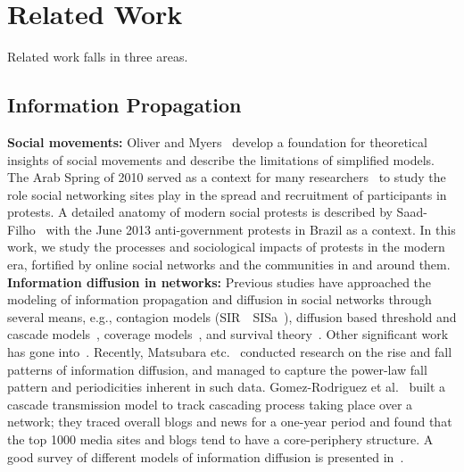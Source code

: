 \chapter{Related Work}
\label{ch:related}

Related work falls in three areas.

\section{Information Propagation}
\par \noindent
{\bf Social movements:}
Oliver and Myers~\cite{oliver1998diffusion} develop a foundation for theoretical insights of social movements and describe the limitations of simplified models. The Arab Spring of  2010
served as a context for many researchers~\cite{gonzalez2011dynamics, bond201261, tufekci2012social, conover2013digital, saad2013mass} to study the role social networking sites play in the spread and recruitment of participants in protests. A detailed anatomy of modern social protests is described by Saad-Filho~\cite{saad2013mass} with the June 2013 anti-government protests in Brazil as a context.
In this work, we study the processes and sociological impacts of protests in the modern era, fortified by online social networks and the communities in and around them.\\


\noindent
{\bf Information diffusion in networks:}
Previous studies have approached the modeling of information propagation and diffusion in social networks through several means, e.g., contagion models (SIR~\cite{castellini2007propagation}\, SISa~\cite{hill2010emotions}), diffusion based threshold and cascade models~\cite{kempe2003maximizing}, coverage models~\cite{singer2012win}, and survival theory~\cite{rodriguez2013modeling}. Other significant work has gone into~\cite{Cha10measuringuser,Kwak:2010:TSN:1772690.1772751,Romero:2011:DMI:1963405.1963503,Yang_predictingthe}.
Recently, Matsubara etc.~\cite{matsubara2012rise}
conducted research on the rise and fall patterns of information diffusion, and managed to
capture the power-law fall pattern and periodicities inherent in such data.
Gomez-Rodriguez et al.~\cite{GomezRodriguez:2010:IND:1835804.1835933}
built a cascade transmission model to track cascading process taking place over a network; they traced overall blogs and news for a one-year period and found that the top 1000 media sites and blogs tend to have a core-periphery structure. A good survey of
different models of information diffusion is presented in~\cite{guille2013information}.\\



